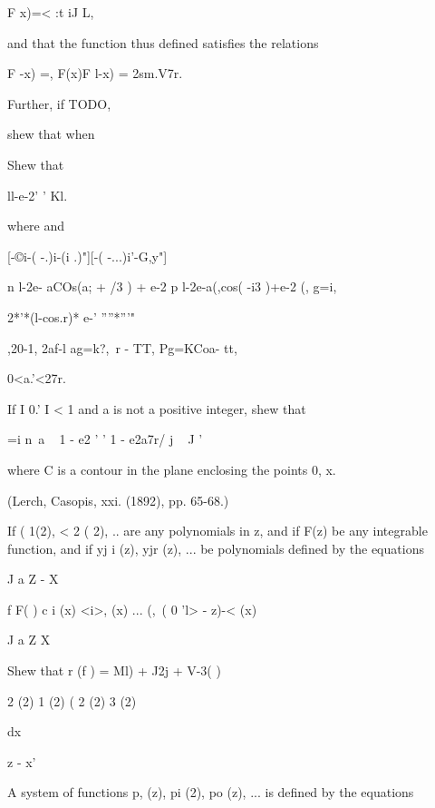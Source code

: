 \begin{wandwmiscexamples}
\begin{wandwmiscexample}
    F x)=< :t iJ L,

    and that the function thus defined satisfies the relations

    F -x) =, F(x)F l-x) = 2sm.V7r.

    Further, if TODO,

    shew that when
  \end{wandwmiscexample}
  \begin{wandwmiscexample}
    Shew that

    ll-e-2' ' Kl.


    where and

    [-©i-( -.)i-(i .)"][-( -...)i'-G,y"]

    n l-2e- aCOs(a; + /3 ) + e-2 p l-2e-a(,cos( -i3 )+e-2 (, g=i,

    2*'*(l-cos.r)* e-' ''''*'''"

    ,20-1, 2af-l ag=k?,\ r - TT, Pg=KCoa- tt,

    0<a.'<27r.

  \end{wandwmiscexample}
  \begin{wandwmiscexample}
    If I 0.' I < 1 and a is not a positive integer, shew that

    =i n~a ~ 1 - e2 ' ' 1 - e2a7r/ j ~ J '

    where C is a contour in the plane enclosing the points 0, x.

    (Lerch, Casopis, xxi. (1892), pp. 65-68.)
  \end{wandwmiscexample}
  \begin{wandwmiscexample}
    If ( 1(2), < 2 ( 2), .. are any polynomials in z, and if F(z) be
    any integrable function, and if yj i (z), yjr (z), ... be polynomials
    defined by the equations

    J a Z - X

    f F( ) c i (x) <i>, (x) ... (,\, ( 0 'l> - z)-< (x)

    J a Z X

    Shew that r (f ) = Ml) + J2j + V-3( )

    2 (2) 1 (2) ( 2 (2) 3 (2)

    dx

    z - x'
  \end{wandwmiscexample}
  \begin{wandwmiscexample}
    A system of functions p, (z), pi (2), po (z), ... is defined by
    the equations


\end{wandwmiscexample}
\end{wandwmiscexamples}
